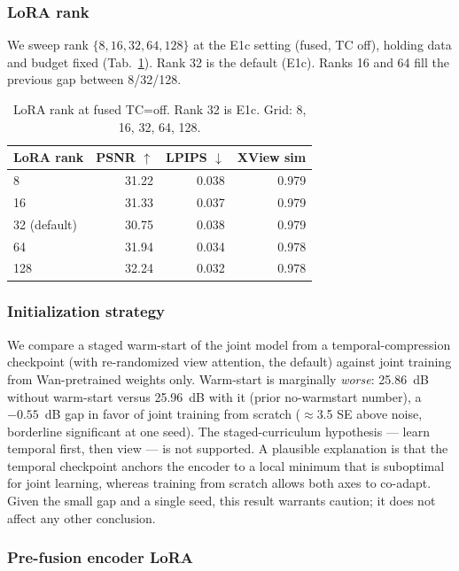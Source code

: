 \subsubsection{LoRA rank}

We sweep rank $\{8,16,32,64,128\}$ at the E1c setting (fused, TC off), holding data and budget fixed (Tab.~\ref{tab:lora_rank}). Rank 32 is the default (E1c). Ranks 16 and 64 fill the previous gap between 8/32/128.

\begin{table}[t]
\centering
\caption{LoRA rank at fused TC=off. Rank 32 is E1c. Grid: 8, 16, 32, 64, 128.}
\label{tab:lora_rank}
\begin{tabular}{lrrr}
\toprule
LoRA rank & PSNR $\uparrow$ & LPIPS $\downarrow$ & XView sim \\
\midrule
8            & 31.22 & 0.038 & 0.979 \\
16           & 31.33 & 0.037 & 0.979 \\
32 (default) & 30.75 & 0.038 & 0.979 \\
64           & 31.94 & 0.034 & 0.978 \\
128          & 32.24 & 0.032 & 0.978 \\
\bottomrule
\end{tabular}
\end{table}


\subsubsection{Initialization strategy}
We compare a staged warm-start of the joint model from a temporal-compression checkpoint (with re-randomized view attention, the default) against joint training from Wan-pretrained weights only. Warm-start is marginally \emph{worse}: 25.86~dB without warm-start versus 25.96~dB with it (prior no-warmstart number), a ${-}0.55$~dB gap in favor of joint training from scratch ($\approx$3.5 SE above noise, borderline significant at one seed). The staged-curriculum hypothesis --- learn temporal first, then view --- is not supported. A plausible explanation is that the temporal checkpoint anchors the encoder to a local minimum that is suboptimal for joint learning, whereas training from scratch allows both axes to co-adapt. Given the small gap and a single seed, this result warrants caution; it does not affect any other conclusion.


\subsubsection{Pre-fusion encoder LoRA}

